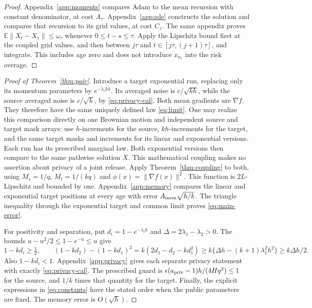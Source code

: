 \documentclass[a4paper,11pt]{article}
\theoremstyle{remark}
\newcommand{\E}{\mathbb E}
\newcommand{\norm}[1]{\lVert#1\rVert}
\begin{document}
\begin{proof}
Appendix~\ref{app:moments} compares Adam to the mean recursion with constant
denominator, at cost $A_\tau$. Appendix~\ref{app:sde} constructs the solution
and compares that recursion to its grid values, at cost $C_\tau$.
The same appendix proves
$\E\norm{X_t-X_s}\le\omega_\tau$ whenever $0\le t-s\le\tau$.
Apply the Lipschitz bound first at the coupled grid values, and then between
$j\tau$ and $t\in[j\tau,(j+1)\tau]$, and integrate. This includes age zero
and does not introduce $x_{n_\tau}$ into the risk average.
\end{proof}

\begin{proof}[Proof of Theorem~\ref{thm:pair}]
Introduce a target exponential run, replacing only its momentum parameters
by $e^{-\lambda_i kh}$. Its averaged noise is $c/\sqrt{kh}$, while the
source averaged noise is $c/\sqrt h$, by \eqref{eq:privacy-cal}.
Both mean gradients are $\nabla f$. They therefore have the same uniquely
defined law \eqref{eq:limit}. One may realize this comparison directly on
one Brownian motion and independent source and target mask arrays: use
$h$-increments for the source, $kh$-increments for the target, and the same
target masks and increments for its linear and exponential versions.
Each run has its prescribed marginal law. Both exponential versions then
compare to the same pathwise solution $X$. This mathematical coupling makes
no assertion about privacy of a joint release.
Apply Theorem~\ref{thm:coupling} to both,
using $M_s=1/q$, $M_t=1/(kq)$ and
$\phi(x)=\norm{\nabla f(x)}^2$. This function is $2L$-Lipschitz and
bounded by one. Appendix~\ref{app:memory} compares the linear and exponential
target positions at every age with error $A_{\rm mem}\sqrt{h/k}$.
The triangle inequality through the exponential target and common limit
proves \eqref{eq:main-error}.

For positivity and separation, put $d_i=1-e^{-\lambda_i h}$ and
$\Delta=2\lambda_1-\lambda_2>0$. The bounds
$u-u^2/2\le1-e^{-u}\le u$ give
\[
 1-kd_i\ge\tfrac12,\qquad
 (1-kd_2)-(1-kd_1)^2
 =k(2d_1-d_2-kd_1^2)
 \ge k\{\Delta h-(k+1)\lambda_1^2h^2\}\ge k\Delta h/2.
\]
Also $1-kd_i<1$. Appendix~\ref{app:privacy} gives each separate privacy
statement with exactly \eqref{eq:privacy-cal}. The prescribed guard is
$\epsilon(a_{\rm priv}-1)h/(4Hq^2)\le1$ for the source, and $1/k$ times
that quantity for the target. Finally, the explicit expressions in
\eqref{eq:constants} have the stated order when the public parameters are
fixed. The memory error is $O(\sqrt h)$.
\end{proof}
\end{document}
